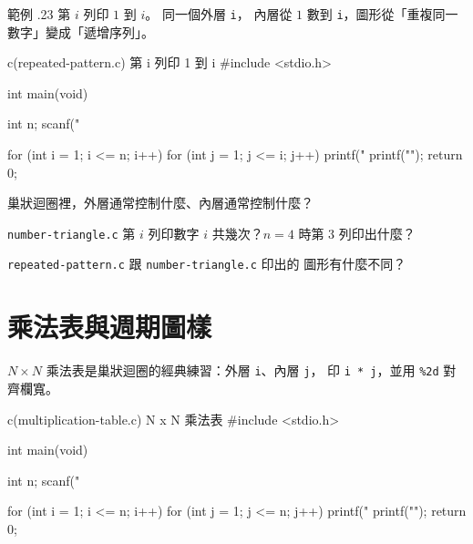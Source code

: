 
範例 \thechapter.23 第 $i$ 列印 $1$ 到 $i$。 同一個外層 \texttt{i}，
內層從 $1$ 數到 \texttt{i}，圖形從「重複同一數字」變成「遞增序列」。

\begin{example}{c}{(repeated-pattern.c) 第 i 列印 1 到 i}
#include <stdio.h>

int main(void) {
    int n;
    scanf("%

    for (int i = 1; i <= n; i++) {
        for (int j = 1; j <= i; j++) {
            printf("%
        }
        printf("\n");
    }
    return 0;
}
\end{example}



\begin{drills}[label=drills:loop-nested-shapes]
\item 巢狀迴圈裡，外層通常控制什麼、內層通常控制什麼？
\item \texttt{number-triangle.c} 第 $i$ 列印數字 $i$ 共幾次？$n = 4$
時第 $3$ 列印出什麼？
\item \texttt{repeated-pattern.c} 跟 \texttt{number-triangle.c} 印出的
圖形有什麼不同？
\end{drills}

\section{乘法表與週期圖樣}
\label{sec:loop-mult-table}

$N \times N$ 乘法表是巢狀迴圈的經典練習：外層 \texttt{i}、內層 \texttt{j}，
印 \texttt{i * j}，並用 \texttt{\%2d} 對齊欄寬。

\begin{example}{c}{(multiplication-table.c) N x N 乘法表}
#include <stdio.h>

int main(void) {
    int n;
    scanf("%

    for (int i = 1; i <= n; i++) {
        for (int j = 1; j <= n; j++) {
            printf("%
        }
        printf("\n");
    }
    return 0;
}
\end{example}

